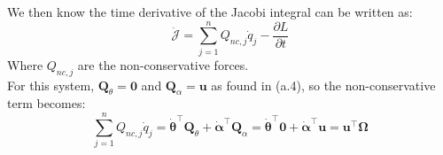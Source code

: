 \documentclass[titlepage]{article}
\begin{document}
We then know the time derivative of the Jacobi integral can be written as:
\begin{equation}
	\dot{\mathcal{J}}=\sum_{j=1}^{n}Q_{nc,j}\dot{q}_j-\frac{\partial L}{\partial t}
\end{equation}
Where $Q_{nc,j}$ are the non-conservative forces. \\

For this system, $\boldsymbol{Q}_\theta=\boldsymbol{0}$ and $\boldsymbol{Q}_\alpha=\boldsymbol{u}$ as found in (a.4), so the non-conservative term becomes:
\begin{equation}
	\sum_{j=1}^{n}Q_{nc,j}\dot{q}_j=\dot{\boldsymbol{\theta}}^\top\boldsymbol{Q}_\theta+\dot{\boldsymbol{\alpha}}^\top\boldsymbol{Q}_\alpha=\dot{\boldsymbol{\theta}}^\top\boldsymbol{0}+\dot{\boldsymbol{\alpha}}^\top\boldsymbol{u}=\boldsymbol{u}^\top\boldsymbol{\Omega}
\end{equation}
\end{document}
